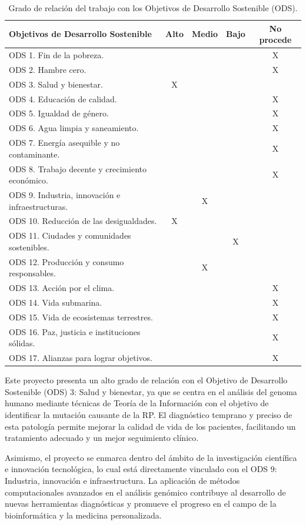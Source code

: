 \documentclass[11pt,spanish,listoffigures,listoftables]{tfgetsinf}
\begin{document}
\begin{table}[H]
\centering
\caption{Grado de relación del trabajo con los Objetivos de Desarrollo Sostenible (\acs{ODS}).}
\begin{tabular}{|p{7cm}|c|c|c|c|}
\hline
\textbf{Objetivos de Desarrollo Sostenible} & \textbf{Alto} & \textbf{Medio} & \textbf{Bajo} & \textbf{No procede} \\
\hline
ODS 1. Fin de la pobreza. & & & & X \\
ODS 2. Hambre cero. & & & & X \\
ODS 3. Salud y bienestar. & X & & & \\
ODS 4. Educación de calidad. & & & & X \\
ODS 5. Igualdad de género. & & & & X \\
ODS 6. Agua limpia y saneamiento. & & & & X \\
ODS 7. Energía asequible y no contaminante. & & & & X \\
ODS 8. Trabajo decente y crecimiento económico. & & & & X \\
ODS 9. Industria, innovación e infraestructuras. & & X & & \\
ODS 10. Reducción de las desigualdades. & X & & & \\
ODS 11. Ciudades y comunidades sostenibles. & & & X & \\
ODS 12. Producción y consumo responsables. & & X & & \\
ODS 13. Acción por el clima. & & & & X \\
ODS 14. Vida submarina. & & & & X \\
ODS 15. Vida de ecosistemas terrestres. & & & & X \\
ODS 16. Paz, justicia e instituciones sólidas. & & & & X \\
ODS 17. Alianzas para lograr objetivos. & & & & X \\
\hline
\end{tabular}
\end{table}


Este proyecto presenta un alto grado de relación con el Objetivo de Desarrollo Sostenible (\acs{ODS}) 3: Salud y bienestar, ya que se centra en el análisis del genoma humano mediante técnicas de Teoría de la Información con el objetivo de identificar la mutación causante de la \acs{RP}. El diagnóstico temprano y preciso de esta patología permite mejorar la calidad de vida de los pacientes, facilitando un tratamiento adecuado y un mejor seguimiento clínico.

Asimismo, el proyecto se enmarca dentro del ámbito de la investigación científica e innovación tecnológica, lo cual está directamente vinculado con el \acs{ODS} 9: Industria, innovación e infraestructura. La aplicación de métodos computacionales avanzados en el análisis genómico contribuye al desarrollo de nuevas herramientas diagnósticas y promueve el progreso en el campo de la bioinformática y la medicina personalizada.
\end{document}
